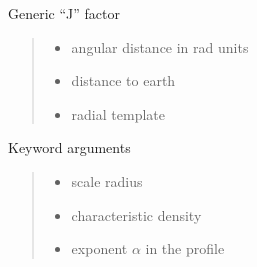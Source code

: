\documentclass[letterpaper,10pt,english]{sphinxmanual}
\begin{document}

\begin{fulllineitems}
\label{\detokenize{diffsph.profiles:diffsph.profiles.hfactors.J_factor}}
\pysigstartsignatures
{}
\pysigstopsignatures
\sphinxAtStartPar
Generic “J” factor
\begin{quote}\begin{description}
\begin{itemize}
\item {} 
\sphinxAtStartPar
{} \textendash{} angular distance in rad units

\item {} 
\sphinxAtStartPar
{} \textendash{} distance to earth

\item {} 
\sphinxAtStartPar
{} \textendash{} radial template

\end{itemize}

\end{description}\end{quote}

\sphinxAtStartPar
Keyword arguments
\begin{quote}\begin{description}
\begin{itemize}
\item {} 
\sphinxAtStartPar
{} \textendash{} scale radius

\item {} 
\sphinxAtStartPar
{} \textendash{} characteristic density

\item {} 
\sphinxAtStartPar
{} \textendash{} exponent \(\alpha\) in the {\hyperref[\detokenize{diffsph.profiles:diffsph.profiles.templates.hdz}]{}} profile


\end{itemize}
\end{description}
\end{quote}
\end{fulllineitems}
\end{document}

